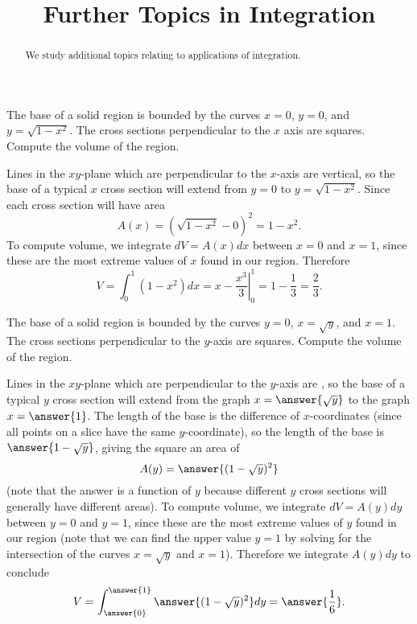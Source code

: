 \documentclass{ximera}
\title{Further Topics in Integration}
\begin{document}
\begin{abstract}
We study additional topics relating to applications of integration.
\end{abstract}
\maketitle

\begin{example}
The base of a solid region is bounded by the curves $x = 0$, $y= 0$, and $y = \sqrt{1-x^2}$. The cross sections perpendicular to the $x$ axis are squares. Compute the volume of the region.
\begin{solution}
Lines in the $xy$-plane which are perpendicular to the $x$-axis are vertical, so the base of a typical $x$ cross section will extend from $y=0$ to $y = \sqrt{1-x^2}$. Since each cross section will have area
\[ A(x) = \left( \sqrt{1-x^2} - 0 \right)^2 = 1-x^2. \]
To compute volume, we integrate $dV = A(x) dx$ between $x=0$ and $x=1$, since these are the most extreme values of $x$ found in our region. Therefore
\[ V = \int_0^1 ( 1 -x^2) dx = \left. x - \frac{x^3}{3} \right|_0^1 = 1 - \frac{1}{3} = \frac{2}{3}. \]
\end{solution}
\end{example}

\begin{example}
The base of a solid region is bounded by the curves $y = 0$, $x = \sqrt{y}$, and $x = 1$. The cross sections perpendicular to the $y$-axis are squares. Compute the volume of the region.
\begin{solution}
Lines in the $xy$-plane which are perpendicular to the $y$-axis are , so the base of a typical $y$ cross section will extend from the graph $x=\answer{\sqrt{y}}$ to the graph $x = \answer{1}$. The length of the base is the difference of $x$-coordinates (since all points on a slice have the same $y$-coordinate), so the length of the base is $\answer{1 - \sqrt{y}}$, giving the square an area of 
\[ A(y) = \answer{(1-\sqrt{y})^2} \]
(note that the answer is a function of $y$ because different $y$ cross sections will generally have different areas).
To compute volume, we integrate $dV = A(y) dy$ between $y=0$ and $y=1$, since these are the most extreme values of $y$ found in our region (note that we can find the upper value $y=1$ by solving for the intersection of the curves $x = \sqrt{y}$ and $x=1$). Therefore we integrate $A(y) dy$ to conclude
\[ V = \int_{\answer{0}}^{\answer{1}} \answer{(1-\sqrt{y})^2} dy = \answer{\frac{1}{6}}. \]
\end{solution}
\end{example}
\end{document}
